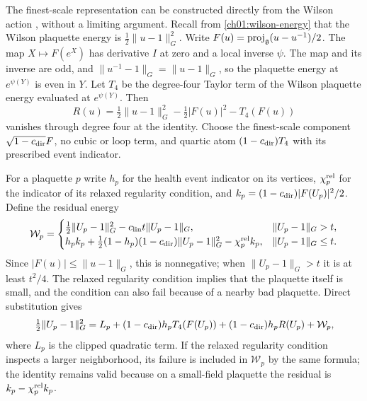 The finest-scale representation can be constructed directly
from the Wilson action \cite{Wilson1974}, without a limiting
argument. Recall from \eqref{ch01:wilson-energy} that the Wilson plaquette energy
is $\tfrac12\|u-1\|_G^2$. Write $F(u)=\operatorname{proj}_{\mathfrak g}(u-u^{-1})/2$.
The map $X\mapsto F(e^X)$ has derivative $I$ at zero and a
local inverse $\psi$. The map and its inverse are odd, and
$\|u^{-1}-1\|_G=\|u-1\|_G$, so the plaquette energy at $e^{\psi(Y)}$ is even in $Y$.
Let $T_4$ be the degree-four Taylor
term of the Wilson plaquette energy evaluated at
$e^{\psi(Y)}$. Then
\[
 R(u)=\tfrac12\|u-1\|_G^2-\tfrac12|F(u)|^2-T_4(F(u))
\]
vanishes through degree four at the identity.
Choose the finest-scale component
$\sqrt{1-c_{\rm dir}}F$, no cubic or loop term, and quartic
atom $(1-c_{\rm dir})T_4$ with its prescribed event indicator.

For a plaquette $p$ write $h_p$ for the health event indicator on its
vertices, $\chi_p^{\rm rel}$ for the indicator of its relaxed regularity condition, and
$k_p=(1-c_{\rm dir})|F(U_p)|^2/2$.
Define the residual energy
\[
 \mathcal W_p=
 \begin{cases}
 \tfrac12\|U_p-1\|_G^2-c_{\rm lin}t\|U_p-1\|_G,&\|U_p-1\|_G>t,\\
 h_pk_p+\tfrac12(1-h_p)(1-c_{\rm dir})\|U_p-1\|_G^2
                   -\chi_p^{\rm rel}k_p,&\|U_p-1\|_G\le t.
 \end{cases}
\]
Since $|F(u)|\le\|u-1\|_G$,
this is nonnegative; when $\|U_p-1\|_G>t$ it is at least
$t^2/4$. The relaxed regularity condition implies that the plaquette
itself is small, and the condition can also fail because of a nearby bad
plaquette. Direct substitution
gives
\[
 \tfrac12\|U_p-1\|_G^2=L_p+(1-c_{\rm dir})h_pT_4(F(U_p))
           +(1-c_{\rm dir})h_pR(U_p)+\mathcal W_p ,
\]
where $L_p$ is the clipped quadratic term.
If the relaxed regularity condition inspects a larger neighborhood, its
failure is included in $\mathcal W_p$ by the same formula;
the identity remains valid because on a small-field plaquette
the residual is $k_p-\chi_p^{\rm rel}k_p$.

